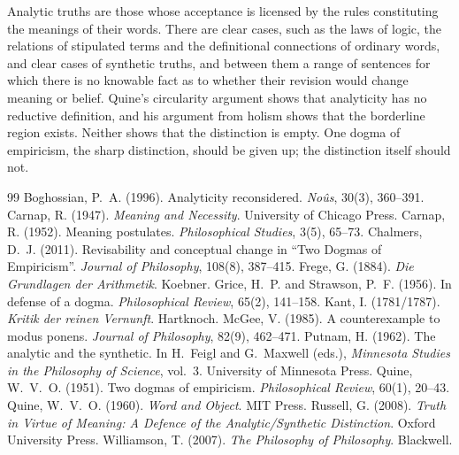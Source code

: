 \documentclass{situationist-preprint}
\begin{document}
Analytic truths are those whose acceptance is licensed by the rules constituting the meanings of their words. There are clear cases, such as the laws of logic, the relations of stipulated terms and the definitional connections of ordinary words, and clear cases of synthetic truths, and between them a range of sentences for which there is no knowable fact as to whether their revision would change meaning or belief. Quine's circularity argument shows that analyticity has no reductive definition, and his argument from holism shows that the borderline region exists. Neither shows that the distinction is empty. One dogma of empiricism, the sharp distinction, should be given up; the distinction itself should not.

\begin{thebibliography}{99}\small
{} Boghossian, P.~A. (1996). Analyticity reconsidered. \emph{No{\^u}s}, 30(3), 360--391.
 Carnap, R. (1947). \emph{Meaning and Necessity}. University of Chicago Press.
 Carnap, R. (1952). Meaning postulates. \emph{Philosophical Studies}, 3(5), 65--73.
 Chalmers, D.~J. (2011). Revisability and conceptual change in \enquote{Two Dogmas of Empiricism}. \emph{Journal of Philosophy}, 108(8), 387--415.
 Frege, G. (1884). \emph{Die Grundlagen der Arithmetik}. Koebner.
 Grice, H.~P. and Strawson, P.~F. (1956). In defense of a dogma. \emph{Philosophical Review}, 65(2), 141--158.
 Kant, I. (1781/1787). \emph{Kritik der reinen Vernunft}. Hartknoch.
 McGee, V. (1985). A counterexample to modus ponens. \emph{Journal of Philosophy}, 82(9), 462--471.
 Putnam, H. (1962). The analytic and the synthetic. In H.~Feigl and G.~Maxwell (eds.), \emph{Minnesota Studies in the Philosophy of Science}, vol.~3. University of Minnesota Press.
 Quine, W.~V.~O. (1951). Two dogmas of empiricism. \emph{Philosophical Review}, 60(1), 20--43.
 Quine, W.~V.~O. (1960). \emph{Word and Object}. MIT Press.
 Russell, G. (2008). \emph{Truth in Virtue of Meaning: A Defence of the Analytic/Synthetic Distinction}. Oxford University Press.
 Williamson, T. (2007). \emph{The Philosophy of Philosophy}. Blackwell.
\end{thebibliography}
\end{document}
